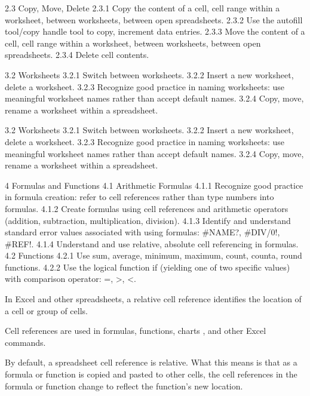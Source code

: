 2.3 Copy, Move, Delete 
2.3.1 Copy the content of a cell, cell  range within a worksheet, 
between worksheets, between open spreadsheets. 
 2.3.2 Use the autofill tool/copy handle 
tool to copy, increment data 
entries. 
 2.3.3 Move the content of a cell, cell 
range within a worksheet, 
between worksheets, between 
open spreadsheets. 
2.3.4 Delete cell contents. 


3.2 Worksheets 3.2.1 Switch between worksheets. 
 3.2.2 Insert a new worksheet, delete a 
worksheet. 
 3.2.3 Recognize good practice in 
naming worksheets: use 
meaningful worksheet names 
rather than accept default 
names. 
 3.2.4 Copy, move, rename a 
worksheet within a spreadsheet. 



3.2 Worksheets 3.2.1 Switch between worksheets. 
 3.2.2 Insert a new worksheet, delete a 
worksheet. 
 3.2.3 Recognize good practice in 
naming worksheets: use 
meaningful worksheet names 
rather than accept default 
names. 
 3.2.4 Copy, move, rename a 
worksheet within a spreadsheet. 


4 Formulas and 
Functions 
4.1 Arithmetic Formulas 4.1.1 Recognize good practice in 
formula creation: refer to cell 
references rather than type 
numbers into formulas. 
 4.1.2 Create formulas using cell 
references and arithmetic 
operators (addition, subtraction, 
multiplication, division). 
 4.1.3 Identify and understand standard error values associated with 
using formulas: #NAME?, 
#DIV/0!, #REF!. 
 4.1.4 Understand and use relative, absolute cell referencing in 
formulas. 
 4.2 Functions 4.2.1 Use sum, average, minimum, 
maximum, count, counta, round 
functions.
4.2.2 Use the logical function if 
(yielding one of two specific 
values) with comparison 
operator: =, >, <. 



In Excel and other spreadsheets, a relative cell reference identifies the location of a cell or group of cells.

Cell references are used in formulas, functions, charts , and other Excel commands.

By default, a spreadsheet cell reference is relative. What this means is that as a formula or function is copied and pasted to other cells, the cell references in the formula or function change to reflect the function's new location.

